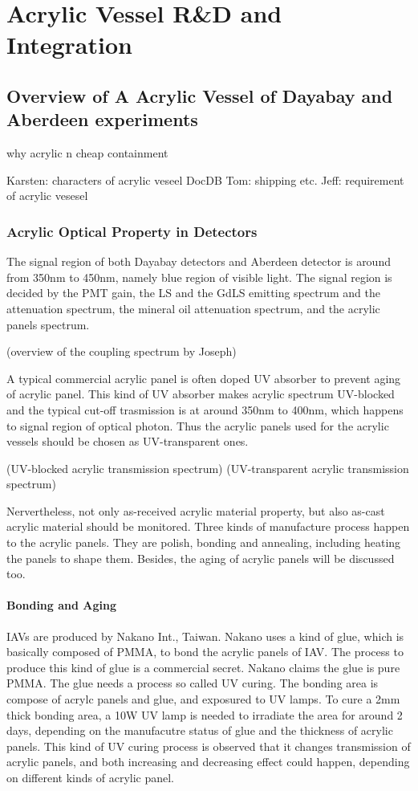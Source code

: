 \chapter {Acrylic Vessel R\&D and Integration}

\section {Overview of A Acrylic Vessel of Dayabay and Aberdeen experiments}


why acrylic
n
cheap
containment


Karsten: characters of acrylic veseel DocDB
Tom: shipping etc.
Jeff: requirement of acrylic vesesel

\subsection {Acrylic Optical Property in Detectors}

The signal region of both Dayabay detectors and Aberdeen detector
is around from 350nm to 450nm, namely blue region of visible light.
The signal region is decided by the PMT gain, the LS and the GdLS emitting spectrum and
the attenuation spectrum, the mineral oil attenuation spectrum, and
the acrylic panels spectrum.

(overview of the coupling spectrum by Joseph)

A typical commercial acrylic panel is often doped UV absorber
to prevent aging of acrylic panel. This kind of UV absorber makes acrylic spectrum
UV-blocked and the typical cut-off trasmission is at around 350nm to 400nm,
which happens to signal region of optical photon.
Thus the acrylic panels used for the acrylic vessels should be chosen as
UV-transparent ones.

(UV-blocked acrylic transmission spectrum)
(UV-transparent acrylic transmission spectrum)


Nervertheless, not only as-received acrylic material property, but also as-cast
acrylic material should be monitored. Three kinds of manufacture process happen to the acrylic panels.
They are polish, bonding and annealing, including heating the panels to shape them. Besides,
the aging of acrylic panels will be discussed too.

\subsubsection {Bonding and Aging}

IAVs are produced by Nakano Int., Taiwan. Nakano uses a kind of glue, which is basically
composed of PMMA, to bond the acrylic panels of IAV. The process to produce this kind of glue is a commercial
secret. Nakano claims the glue is pure PMMA. The glue needs a process so called UV curing. The bonding area
is compose of acrylc panels and glue, and exposured to UV lamps. To cure a 2mm thick bonding
area, a 10W UV lamp is needed to irradiate the area for around 2 days, depending on the manufacutre status of glue
and the thickness of acrylic panels. This kind of UV curing process is observed that it changes transmission of acrylic panels,
and both increasing and decreasing effect could happen, depending on different kinds of acrylic panel.


